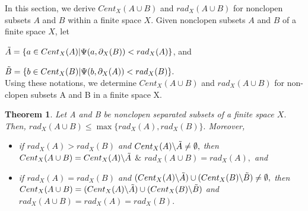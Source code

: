 \documentclass[12pt]{amsart}
\newtheorem{theorem}[definition]{Theorem}
\begin{document}
In this section, we derive $Cent_{X}(A \cup B)$ and  $rad_{X}(A \cup B)$ for nonclopen subsets $A$ and $B$ within a finite space $X$. Given nonclopen subsets $A$ and $B$ of a finite space $X$, let\par
\hspace{2mm} $\Tilde{A}=\{a\in Cent_{X}(A)|\Psi(a, \partial_{X}(B))<rad_{X}(A)\}$, and\par
\hspace{2mm} $\Tilde{B}=\{b\in Cent_{X}(B)|\Psi(b,\partial_{X}(A))<rad_{X}(B)\}.$\\
Using these notations, we determine $Cent_{X}(A \cup B)$ and  $rad_{X}(A \cup B)$ for non-clopen subsets A and B in a finite  space X.

\begin{theorem}\label{2.25}
Let A and B be  nonclopen separated subsets of a finite space $X.$ Then, $rad_{X}(A\cup B)\leq \max\{rad_{X}(A),rad_{X}(B)\}.$  Moreover,
\begin{itemize}
	\item[(i)] if $rad_{X}(A)>rad_{X}(B)$ and $Cent_{X}(A)\backslash\Tilde{A}\neq\emptyset,$ then $Cent_{X}(A\cup B)=Cent_{X}(A)\backslash\Tilde{A}$ $\&$ $rad_{X}(A\cup B)=rad_{X}(A),$ and
	\item[(ii)]\label{3.33(ii)} if $rad_{X}(A)=rad_{X}(B)$ and $(Cent_{X}(A)\backslash\Tilde{A})\cup (Cent_{X}(B)\backslash\Tilde{B})\neq\emptyset,$ then $Cent_{X}(A\cup B)=(Cent_{X}(A)\backslash\Tilde{A})\cup (Cent_{X}(B)\backslash\Tilde{B})$ and  $rad_{X}(A\cup B)=rad_{X}(A)=rad_{X}(B).$
\end{itemize} 
\end{theorem}
\end{document}
